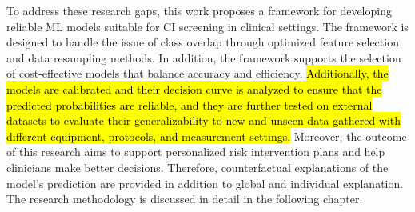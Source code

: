 To address these research gaps, this work proposes a framework for developing reliable ML models suitable for CI screening in clinical settings. The framework is designed to handle the issue of class overlap through optimized feature selection and data resampling methods. In addition, the framework supports the selection of cost-effective models that balance accuracy and efficiency. \hl{Additionally, the models are calibrated and their decision curve is analyzed to ensure that the predicted probabilities are reliable, and they are further tested on external datasets to evaluate their generalizability to new and unseen data gathered with different equipment, protocols, and measurement settings.} Moreover, the outcome of this research aims to support personalized risk intervention plans and help clinicians make better decisions. Therefore, counterfactual explanations of the model's prediction are provided in addition to global and individual explanation. The research methodology is discussed in detail in the following chapter.
